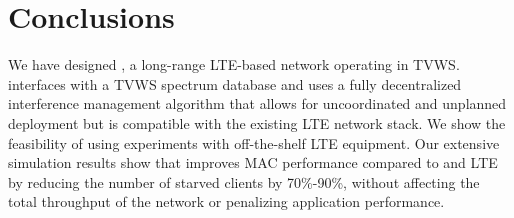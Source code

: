 \section{Conclusions}
We have designed \cf, a long-range LTE-based network operating in TVWS. \cf interfaces with a TVWS spectrum database and uses a fully decentralized interference management algorithm that allows for uncoordinated and unplanned deployment but is compatible with the existing LTE network stack. We show the feasibility of \cf using experiments with off-the-shelf LTE equipment. Our extensive simulation results show that \cf improves MAC performance compared to \wf and LTE by reducing the number of starved clients by 70\%-90\%, without affecting the total throughput of the network or penalizing application performance.
